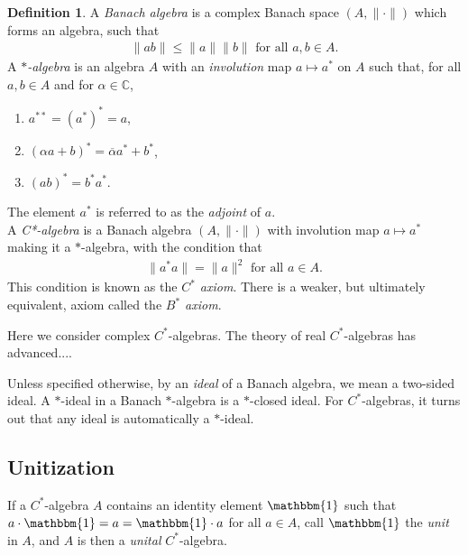 \documentclass[12pt,a4paper]{amsart}
\theoremstyle{plain}
\theoremstyle{definition}
\newtheorem{defn}{Definition}
\newcommand{\1}{\mathbbm{1}}
\newcommand{\C}{\mathbb{C}}
\begin{document}
\begin{defn}
	A \emph{Banach algebra} is a complex Banach space $(A,\|\cdot\|)$ which forms an 
	algebra, such that 
	\begin{align*}
		\|ab\| \leq \|a\| \|b\| \mbox{ for all } a,b \in A.
	\end{align*}
	A \emph{$\ast$-algebra} is an algebra $A$ with an \emph{involution} map 
	$a \mapsto a^\ast$ on $A$ such that, for all $a,b \in A$ and for $\alpha \in \C$,
	
	\begin{enumerate}
		\item $a^{\ast\ast} = (a^\ast)^\ast = a$,
		\item $(\alpha a+b)^\ast = \overline{\alpha} a^\ast + b^\ast$,
		\item $(ab)^\ast = b^\ast a^\ast$.
	\end{enumerate}
	The element $a^\ast$ is referred to as the \emph{adjoint} of $a$. 		\\
	A \emph{C*-algebra} is a Banach algebra $(A, \| \cdot \|)$ with involution 
	map $a \mapsto a^\ast$ making it a $\ast$-algebra, with the condition that
	\begin{align*}
		\|a ^\ast a\| = \|a\|^2 \mbox{ for all } a \in A.
	\end{align*}
	This condition is known as the \emph{$C^\ast$ axiom}. There is a weaker, but 
	ultimately equivalent, axiom called the \emph{$B^\ast$ axiom}. %
\end{defn}
Here we consider complex $C^\ast$-algebras. The theory of real $C^\ast$-algebras has advanced....

Unless specified otherwise, by an \emph{ideal} of a Banach algebra, we mean a two-sided ideal.
A $\ast$-ideal in a Banach $\ast$-algebra is a $\ast$-closed ideal. 
For $C^\ast$-algebras, it turns out that any ideal is automatically a $\ast$-ideal.%

\subsection{Unitization}
If a $C^\ast$-algebra $A$ contains an identity element $\1$ such that 
$a\cdot \1 = a = \1 \cdot a$ for all $a \in A$, call $\1$ the \emph{unit} 
in $A$, and $A$ is then a \emph{unital} $C^\ast$-algebra.
\end{document}

